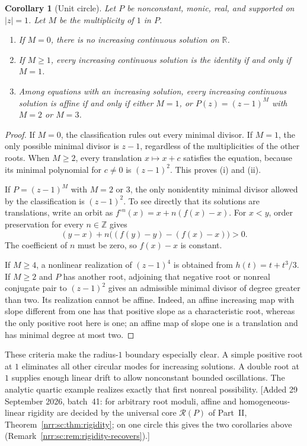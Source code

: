\documentclass[11pt,letterpaper]{article}
\newtheorem{corollary}[theorem]{Corollary}
\theoremstyle{definition}
\theoremstyle{remark}
\newcommand{\R}{\mathbb R}
\newcommand{\Z}{\mathbb Z}
\newcommand{\itn}[2]{#1^{\circ #2}}
\newcommand{\core}{\mathcal R}
\begin{document}
\begin{corollary}[Unit circle]
\label{cor:unitrigidity}
Let $P$ be nonconstant, monic, real, and supported on $|z|=1$.
Let $M$ be the multiplicity of $1$ in $P$.
\begin{enumerate}[label=\textnormal{(\roman*)},leftmargin=2.2em]
\item If $M=0$, there is no increasing continuous solution on $\R$.
\item If $M\ge1$, every increasing continuous solution is the identity
if and only if $M=1$.
\item Among equations with an increasing solution, every increasing
continuous solution is affine if and only if either $M=1$, or
$P(z)=(z-1)^M$ with $M=2$ or $M=3$.
\end{enumerate}
\end{corollary}

\begin{proof}
If $M=0$, the classification rules out every minimal divisor.
If $M=1$, the only possible minimal divisor is $z-1$, regardless of the
multiplicities of the other roots. When $M\ge2$, every translation
$x\mapsto x+c$ satisfies the equation, because its minimal polynomial
for $c\ne0$ is $(z-1)^2$. This proves (i) and (ii).

If $P=(z-1)^M$ with $M=2$ or $3$, the only nonidentity minimal divisor
allowed by the classification is $(z-1)^2$. To see directly that its
solutions are translations, write an orbit as
$\itn{f}{n}(x)=x+n(f(x)-x)$. For $x<y$, order preservation for every
$n\in\Z$ gives
\begin{equation}
  (y-x)+n\bigl((f(y)-y)-(f(x)-x)\bigr)>0.
\end{equation}
The coefficient of $n$ must be zero, so $f(x)-x$ is constant.

If $M\ge4$, a nonlinear realization of $(z-1)^4$ is obtained from
$h(t)=t+t^3/3$. If $M\ge2$ and $P$ has another root, adjoining that
negative root or nonreal conjugate pair to $(z-1)^2$ gives an admissible
minimal divisor of degree greater than two. Its realization cannot be
affine. Indeed, an affine increasing map with slope different from one
has that positive slope as a characteristic root, whereas the only
positive root here is one; an affine map of slope one is a translation
and has minimal degree at most two.
\end{proof}

These criteria make the radius-$1$ boundary especially clear. A simple
positive root at $1$ eliminates all other circular modes for increasing
solutions. A double root at $1$ supplies enough linear drift to allow
nonconstant bounded oscillations. The analytic quartic example realizes
exactly that first nonreal possibility.
[Added 29 September 2026, batch~41: for arbitrary root moduli, affine and
homogeneous-linear rigidity are decided by the universal core $\core(P)$ of
Part~II, Theorem~\ref{nrr:sc:thm:rigidity}; on one circle this gives the two
corollaries above (Remark~\ref{nrr:sc:rem:rigidity-recovers}).]
\end{document}
